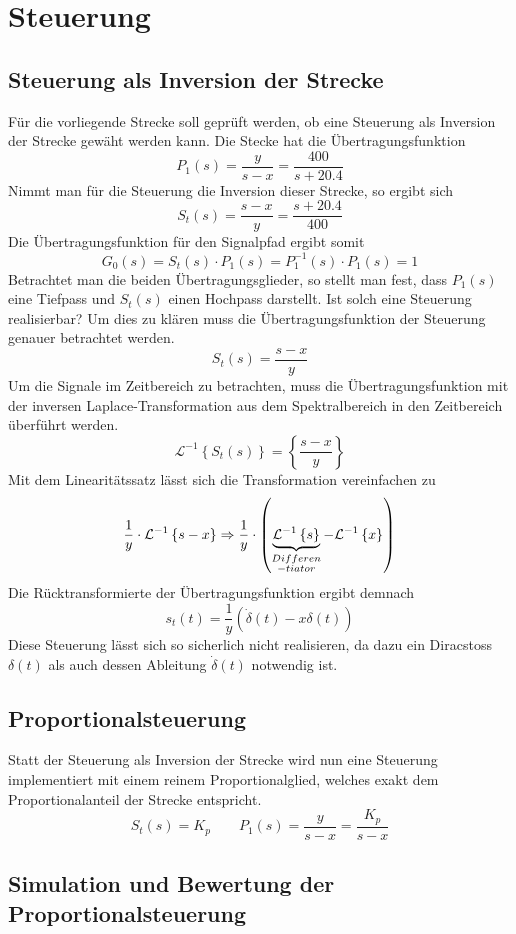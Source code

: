 \section{Steuerung}

\subsection{Steuerung als Inversion der Strecke}
Für die vorliegende Strecke soll geprüft werden, ob eine Steuerung als
Inversion der Strecke gewäht werden kann. Die Stecke hat die
Übertragungsfunktion
\[
	P_1(s) = \frac{y}{s-x} = \frac{400}{s + 20.4}
\]
Nimmt man für die Steuerung die Inversion dieser Strecke, so ergibt sich
\[
	S_t(s) = \frac{s-x}{y} = \frac{s + 20.4}{400}
\]
Die Übertragungsfunktion für den Signalpfad ergibt somit
\[
	G_0(s) = S_t(s) \cdot P_1(s) = P_1^{-1}(s) \cdot P_1(s) = 1
\]
Betrachtet man die beiden Übertragungsglieder, so stellt man fest, dass 
$P_1(s)$ eine Tiefpass und $S_t(s)$ einen Hochpass darstellt. Ist solch
eine Steuerung realisierbar? Um dies zu klären muss die Übertragungsfunktion
der Steuerung genauer betrachtet werden.
\[
	S_t(s) = \frac{s-x}{y}
\]
Um die Signale im Zeitbereich zu betrachten, muss die Übertragungsfunktion
mit der inversen Laplace-Transformation aus dem Spektralbereich in den
Zeitbereich überführt werden.
\[
	\mathcal{L}^{-1} \left\{ S_t(s) \right\}
	= \left\{ \frac{s-x}{y} \right\}
\]
Mit dem Linearitätssatz lässt sich die Transformation vereinfachen zu
\[
	\frac{1}{y} \cdot \mathcal{L}^{-1} \left\{ s-x \right\}
	\Rightarrow
	\frac{1}{y} \cdot \left(
		\underbrace{\mathcal{L}^{-1} \left\{ s \right\}}_{
			\begin{subarray}{c}Differen\\-tiator\end{subarray}}
		- \mathcal{L}^{-1} \left\{ x \right\}
	\right)
\]
Die Rücktransformierte der Übertragungsfunktion ergibt demnach
\[
	s_t(t) = \frac{1}{y} \left( \dot\delta(t) - x\delta(t) \right)
\]
Diese Steuerung lässt sich so sicherlich nicht realisieren, da dazu ein
Diracstoss $\delta(t)$ als auch dessen Ableitung $\dot\delta(t)$ notwendig
ist.

\subsection{Proportionalsteuerung}
Statt der Steuerung als Inversion der Strecke wird nun eine Steuerung
implementiert mit einem reinem Proportionalglied, welches exakt dem 
Proportionalanteil der Strecke entspricht.
\[
	S_t(s) = K_p \qquad  P_1(s) = \frac{y}{s-x} = \frac{K_p}{s-x}
\]

\subsection{Simulation und Bewertung der Proportionalsteuerung}
